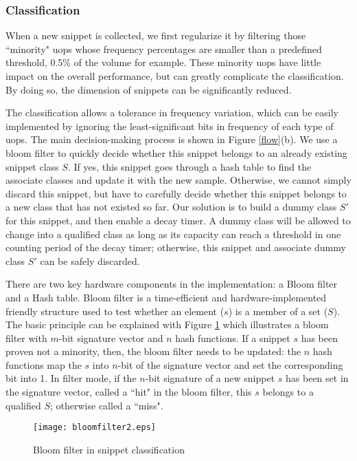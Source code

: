 \subsubsection{Classification}
When a new snippet is collected, we first regularize it by filtering those ``minority" uops whose frequency percentages are smaller than a predefined threshold, 0.5\% of the volume for example. These minority uops have little impact on the overall performance, but can greatly complicate the classification. By doing so, the dimension of snippets can be significantly reduced.

The classification allows a tolerance in frequency variation, which can be easily implemented by ignoring the least-significant bits in frequency of each type of uops.  The main decision-making process is shown in Figure \ref{flow}(b). We use a bloom filter to quickly decide whether this snippet belongs to an already existing snippet class $S$. If yes, this snippet goes through a hash table to find the associate classes and update it with the new sample. Otherwise, we cannot simply discard this snippet, but have to carefully decide whether this snippet belongs to a new class that has not existed so far. Our solution is to build a dummy class $S'$ for this snippet, and then enable a decay timer. A dummy class will be allowed to change into a qualified class as long as its capacity can reach a threshold in one counting period of the decay timer; otherwise, this snippet and associate dummy class $S'$ can be safely discarded.

There are two key hardware components in the implementation: a Bloom filter and a Hash table. Bloom filter is a time-efficient and hardware-implemented friendly  structure used to test whether an element ($s$) is a member of a set ($S$).  The basic principle can be explained with Figure \ref{bfilter} which illustrates a bloom filter with $m$-bit signature vector and $n$ hash functions. If a snippet $s$ has been proven not a minority, then, the bloom filter needs to be updated: the $n$ hash functions map the $s$ into $n$-bit of the signature vector and set the corresponding bit into 1. In filter mode, if the $n$-bit signature of a new snippet $s$ has been set in the signature vector, called a ``hit" in the bloom filter, this $s$ belongs to a qualified $S$; otherwise called a ``miss".

\begin{figure}[t]
  \centering
  \texttt{[image: bloomfilter2.eps]}\\

  \caption{Bloom filter in snippet classification}\label{bfilter}

\end{figure}

